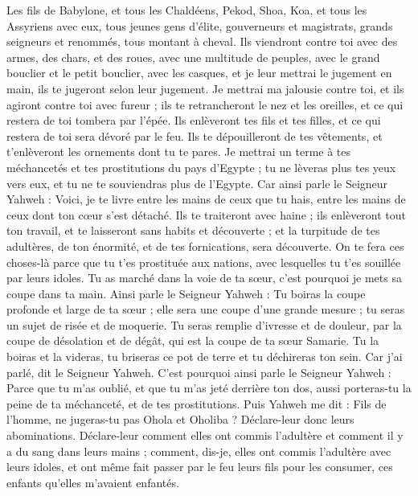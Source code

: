 \begin{multicols}{2}
Les fils de Babylone, et tous les Chaldéens, Pekod, Shoa, Koa, et tous les Assyriens avec eux, tous jeunes gens d'élite, gouverneurs et magistrats, grands seigneurs et renommés, tous montant à cheval.
Ils viendront contre toi avec des armes, des chars, et des roues, avec une multitude de peuples, avec le grand bouclier et le petit bouclier, avec les casques, et je leur mettrai le jugement en main, ils te jugeront selon leur jugement.
Je mettrai ma jalousie contre toi, et ils agiront contre toi avec fureur ; ils te retrancheront le nez et les oreilles, et ce qui restera de toi tombera par l'épée. Ils enlèveront tes fils et tes filles, et ce qui restera de toi sera dévoré par le feu.
Ils te dépouilleront de tes vêtements, et t’enlèveront les ornements dont tu te pares.
Je mettrai un terme à tes méchancetés et tes prostitutions du pays d'Egypte ; tu ne lèveras plus tes yeux vers eux, et tu ne te souviendras plus de l'Egypte.
Car ainsi parle le Seigneur Yahweh : Voici, je te livre entre les mains de ceux que tu hais, entre les mains de ceux dont ton cœur s'est détaché.
Ils te traiteront avec haine ; ils enlèveront tout ton travail, et te laisseront sans habits et découverte ; et la turpitude de tes adultères, de ton énormité, et de tes fornications, sera découverte.
On te fera ces choses-là parce que tu t'es prostituée aux nations, avec lesquelles tu t'es souillée par leurs idoles.
Tu as marché dans la voie de ta sœur, c'est pourquoi je mets sa coupe dans ta main.
Ainsi parle le Seigneur Yahweh : Tu boiras la coupe profonde et large de ta sœur ; elle sera une coupe d'une grande mesure ; tu seras un sujet de risée et de moquerie.
Tu seras remplie d'ivresse et de douleur, par la coupe de désolation et de dégât, qui est la coupe de ta sœur Samarie.
Tu la boiras et la videras, tu briseras ce pot de terre et tu déchireras ton sein. Car j'ai parlé, dit le Seigneur Yahweh.
C'est pourquoi ainsi parle le Seigneur Yahweh : Parce que tu m'as oublié, et que tu m'as jeté derrière ton dos, aussi porteras-tu la peine de ta méchanceté, et de tes prostitutions.
Puis Yahweh me dit : Fils de l’homme, ne jugeras-tu pas Ohola et Oholiba ? Déclare-leur donc leurs abominations.
Déclare-leur comment elles ont commis l’adultère et comment il y a du sang dans leurs mains ; comment, dis-je, elles ont commis l’adultère avec leurs idoles, et ont même fait passer par le feu leurs fils pour les consumer, ces enfants qu'elles m'avaient enfantés.

\end{multicols}
